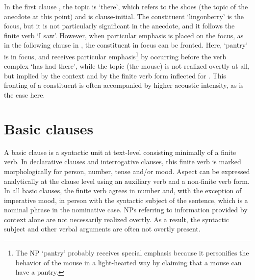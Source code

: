 In the first clause , the topic is  ‘there’, which refers to the shoes (the topic of the anecdote at this point) and is clause-initial. The constituent  ‘lingonberry’ is the focus, but it is not particularly significant in the anecdote, and it follows the finite verb  ‘I saw’. 
However, when particular emphasis is placed on the focus, as in the following clause in , the constituent in focus can be fronted. Here,  ‘pantry’ is in focus, and receives particular emphasis\footnote{The NP  ‘pantry’ probably receives special emphasis because it personifies the behavior of the mouse in a light-hearted way by claiming that a mouse can have a pantry.} by occurring before the verb complex  ‘has had there’, while the topic (the mouse) is not realized overtly at all, but implied by the context and by the finite verb form inflected for . 
This fronting of a constituent is often accompanied by higher acoustic intensity, as is the case here.%




\chapter{Basic clauses}\label{basicClauses}
A basic clause is a syntactic unit at text-level consisting minimally of a finite verb. In declarative clauses and interrogative clauses, this finite verb is marked morphologically for person, number, tense and/or mood. Aspect can be expressed analytically at the clause level using an auxiliary verb and a non-finite verb form. 
In all basic clauses, the finite verb agrees in number and, with the exception of imperative mood, in person with the syntactic subject of the sentence, which is a nominal phrase in the nominative case. 
NPs referring to information provided by context alone are not necessarily realized overtly. As a result, the syntactic subject and other verbal arguments are often not overtly present. 

